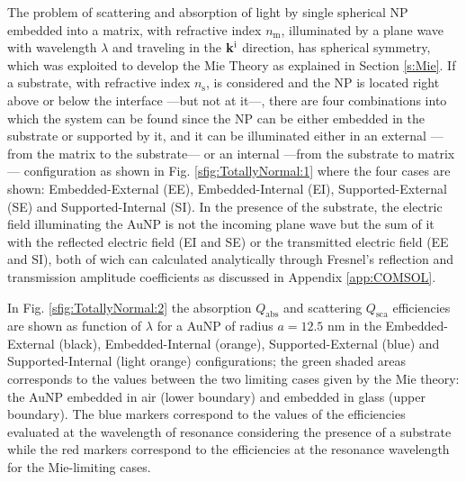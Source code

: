 
The problem of scattering and absorption of light by single spherical NP embedded into a matrix, with refractive index $n_\text{m}$, illuminated by a plane wave with wavelength $\lambda$  and traveling in the  $\vb{k}^\text{i}$ direction, has spherical symmetry, which was exploited to develop the Mie Theory as explained in Section \ref{s:Mie}. If a substrate, with refractive index $n_\text{s}$, is considered and the NP is located right above or below the interface ---but not at it---, there are four combinations into which the system can be found since the NP can be either embedded  in the substrate or supported by it, and it can be illuminated either in an external ---from the matrix to the substrate--- or an internal ---from the substrate to matrix--- configuration as shown in Fig. \ref{sfig:TotallyNormal:1} where the four cases are shown: Embedded-External (EE), Embedded-Internal (EI), Supported-External (SE) and Supported-Internal (SI). In the  presence of the substrate, the electric field illuminating the AuNP is not the incoming plane wave but the sum of it with the reflected electric field (EI and SE) or the transmitted electric field (EE and SI), both of wich can calculated analytically through Fresnel's reflection and transmission amplitude coefficients as discussed in Appendix \ref{app:COMSOL}.

In Fig. \ref{sfig:TotallyNormal:2} the absorption $Q_\text{abs}$ and scattering $Q_\text{sca}$ efficiencies are shown as function of $\lambda$ for a AuNP of radius $a = 12.5$ nm in the Embedded-External (black), Embedded-Internal (orange), Supported-External (blue) and Supported-Internal (light orange) configurations; the green shaded areas corresponds to the values between the two limiting cases given by the Mie theory: the AuNP embedded in air (lower boundary) and embedded in glass (upper boundary). The blue markers correspond to the values of the efficiencies evaluated at the wavelength of resonance considering the presence of a substrate while the red markers correspond to the efficiencies at the resonance wavelength for the Mie-limiting cases.

